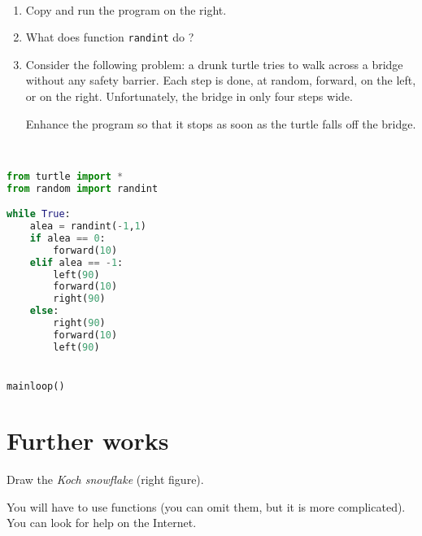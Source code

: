 \documentclass[12pt]{article}
\begin{document}
\begin{multicols}{2}

  ~

  \begin{enumerate}
    \item Copy and run the program on the right.
    \item What does function \texttt{randint} do ?
    \item Consider the following problem: a drunk turtle tries to walk across
      a bridge without any safety barrier. Each step is done, at random,
      forward, on the left, or on the right. Unfortunately, the bridge in
      only four steps wide.

      Enhance the program so that it stops as soon as the turtle falls off the bridge.
  \end{enumerate}

  ~

  \columnbreak

\begin{lstlisting}[language=python,frame=single]
from turtle import *
from random import randint

while True:
    alea = randint(-1,1)
    if alea == 0:
        forward(10)
    elif alea == -1:
        left(90)
        forward(10)
        right(90)
    else:
        right(90)
        forward(10)
        left(90)


mainloop()
\end{lstlisting}
\end{multicols}

\section{Further works}

\begin{multicols}{2}
  \noindent Draw the \emph{Koch snowflake} (right figure).

  \noindent You will have to use functions (you can omit them, but it is more complicated). You can look for help on the Internet.

\end{multicols}
\end{document}
